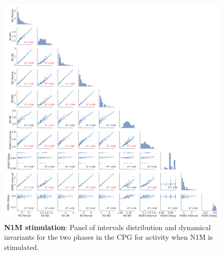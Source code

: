 \begin{figure}[htbp]
	\centering
	\includegraphics[width=\textwidth]{./invariants/data/MODEL/n1m_driven/images/2phases/_output_pairplot.png}
	\caption{\textbf{N1M stimulation}: Panel of intervals distribution and dynamical invariants for the two phases in the CPG for activity when N1M is stimulated.}
	\label{fig:model n1m stimulation pairplot 2phases}
\end{figure}



